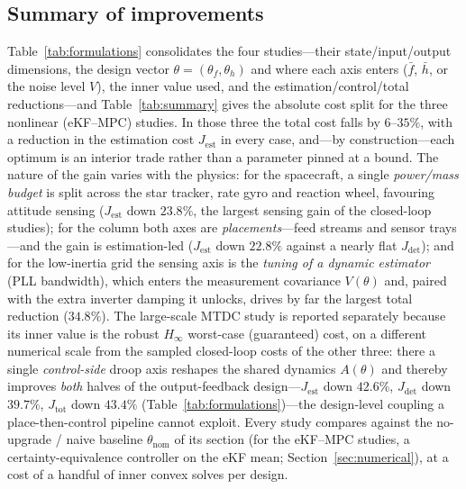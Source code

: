 \documentclass[twocolumn,amsthm]{autart}
\begin{document}
\subsection{Summary of improvements}
\label{sec:sim:summary}

Table~\ref{tab:formulations} consolidates the four studies---their state/input/output
dimensions, the design vector $\theta=(\theta_f,\theta_h)$ and where each axis enters
($\bar f$, $\bar h$, or the noise level $V$), the inner value used, and the
estimation/control/total reductions---and Table~\ref{tab:summary} gives the absolute
cost split for the three nonlinear (eKF--MPC) studies. In those three the total cost
falls by $6$--$35\%$, with a reduction in the estimation
cost $J_{\mathrm{est}}$ in every case, and---by construction---each optimum is an
interior trade rather than a parameter pinned at a bound. The nature of the gain
varies with the physics: for the spacecraft, a single
\emph{power/mass budget} is split across the star tracker, rate gyro and reaction
wheel, favouring attitude sensing ($J_{\mathrm{est}}$ down $23.8\%$, the largest
sensing gain of the closed-loop studies); for the column both axes are
\emph{placements}---feed streams and sensor trays---and the gain is estimation-led
($J_{\mathrm{est}}$ down $22.8\%$ against a nearly flat $J_{\mathrm{det}}$);
and for the low-inertia grid the sensing axis is the \emph{tuning of a dynamic
estimator} (PLL bandwidth), which enters the measurement covariance $V(\theta)$ and,
paired with the extra inverter damping it unlocks, drives by far the largest total
reduction ($34.8\%$). The large-scale MTDC study is reported separately because its
inner value is the robust $H_\infty$ worst-case (guaranteed) cost, on a different
numerical scale from the sampled closed-loop costs of the other three: there a single
\emph{control-side} droop axis reshapes the shared dynamics $A(\theta)$ and thereby
improves \emph{both} halves of the output-feedback design---$J_{\mathrm{est}}$ down
$42.6\%$, $J_{\mathrm{det}}$ down $39.7\%$, $J_{\mathrm{tot}}$ down $43.4\%$
(Table~\ref{tab:formulations})---the design-level coupling a place-then-control
pipeline cannot exploit. Every study compares against the no-upgrade / naive
baseline $\theta_{\mathrm{nom}}$ of its section (for the eKF--MPC studies, a
certainty-equivalence controller on the eKF mean; Section~\ref{sec:numerical}),
at a cost of a handful of inner convex solves per design.
\end{document}
